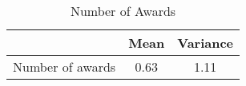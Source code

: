 \begin{table}[htbp]\centering
\caption{Number of Awards}
\begin{tabular}{l*{2}{c}}
\toprule
            &        Mean&    Variance\\
\midrule
Number of awards&        0.63&        1.11\\
\bottomrule
\end{tabular}
\end{table}
